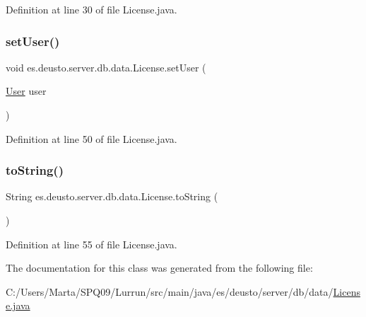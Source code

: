 Definition at line 30 of file License.\+java.

\mbox{\label{classes_1_1deusto_1_1server_1_1db_1_1data_1_1_license_a3ca25ef2a8e0d28af263d67f3d41e893}} 
\subsubsection{\texorpdfstring{set\+User()}{setUser()}}
{\footnotesize\ttfamily void es.\+deusto.\+server.\+db.\+data.\+License.\+set\+User (\begin{DoxyParamCaption}\item[{\hyperlink{classes_1_1deusto_1_1server_1_1db_1_1data_1_1_user}{User}}]{user }\end{DoxyParamCaption})}



Definition at line 50 of file License.\+java.

\mbox{\label{classes_1_1deusto_1_1server_1_1db_1_1data_1_1_license_ae8d930f46f5336bb3478d26ef95c578e}} 
\subsubsection{\texorpdfstring{to\+String()}{toString()}}
{\footnotesize\ttfamily String es.\+deusto.\+server.\+db.\+data.\+License.\+to\+String (\begin{DoxyParamCaption}{ }\end{DoxyParamCaption})}



Definition at line 55 of file License.\+java.



The documentation for this class was generated from the following file\+:\begin{DoxyCompactItemize}
\item 
C\+:/\+Users/\+Marta/\+S\+P\+Q09/\+Lurrun/src/main/java/es/deusto/server/db/data/\hyperlink{_license_8java}{License.\+java}\end{DoxyCompactItemize}
